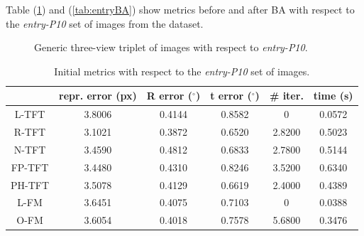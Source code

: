 \pagebreak

Table (\ref{tab:entryInit}) and (\ref{tab:entryBA}) show metrics before and after \acs{BA} with respect to the \textit{entry-P10} set of images from the dataset.

\begin{figure}[h]
    \centering
    \caption[\textit{entry-P10} Triplet]{Generic three-view triplet of images with respect to \textit{entry-P10}. \cite{13-epfl-dataset}}
    \label{fig:entryImage}
\end{figure}

\begin{table}[htbp]
  \centering
  \caption[\textit{entry-P10} Initial Metrics]{Initial metrics with respect to the \textit{entry-P10} set of images.}
  \label{tab:entryInit}
  \begin{tabular}{|*{6}{c}|}
    \hline
     & repr. error (px) & R error ($^{\circ}$) & t error ($^{\circ}$) & \# iter. & time (s)\\
    \hline
    \acs{L-TFT} & 3.8006 & 0.4144 & 0.8582 & 0 & 0.0572 \\
    \acs{R-TFT} & 3.1021 & 0.3872 & 0.6520 & 2.8200 & 0.5023 \\
    \acs{N-TFT} & 3.4590 & 0.4812 & 0.6833 & 2.7800 & 0.5144 \\
    \acs{FP-TFT} & 3.4480 & 0.4310 & 0.8246 & 3.5200 & 0.6340 \\
    \acs{PH-TFT} & 3.5078 & 0.4129 & 0.6619 & 2.4000 & 0.4389 \\
    \acs{L-FM} & 3.6451 & 0.4075 & 0.7103 & 0 & 0.0388 \\
    \acs{O-FM} & 3.6054 & 0.4018 & 0.7578 & 5.6800 & 0.3476 \\
    \hline
  \end{tabular}
\end{table}

